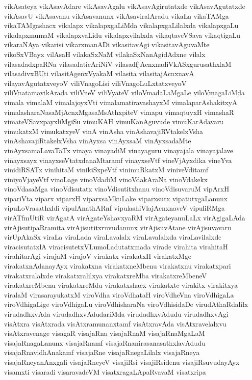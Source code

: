 {vikAsateya
vikAsavAdare
vikAsavAgalu
vikAsavAgirutatxde
vikAsavAgutatxde
vikAsavU
vikAsavanu
vikAsavanunx
vikAsaviralAradu
vikaLa
vikaTAMga
vikaTAMgashacx
vikalapx
vikalapxgaLiMda
vikalapxgaLilalxda
vikalapxgaLu
vikalapxmumaM
vikalapxvaLidu
vikalapxvilalxda
vikaqtaveVSava
vikaqtigaLu
vikaraNAya
vikarisi
vikarxmanADi
vikasitavAgi
vikasitavAguvaMte
vikoSxVBayx
vilAsaH
vilakaSxNaM
vilakaSxNanAgidAdxne
vilalx
vilasadadxpaRNa
vilasadaticAriNiV
vilasadfjAcnxnadiVkASxgurusathxlaM
vilasadivxBUti
vilasitAgenxVyakaM
vilasita
vilasitajAcnxnavA
vilayavAgutatxveyoV
viliVnagoLisi
viliVnagoLuLxtatxveyoV
viliVnatamavikArada
viliVneV
viliVyateV
viloVmadaLaMgaLe
viloVmagaLiMda
vimala
vimalaM
vimalajoyxVti
vimalamatiravashayxM
vimalaparAshakitxyA
vimalasharaNasaMjAcnxMgasaMsAthxpiteV
vimapu
vimaqtuyxH
vimashaR
vimateVSavxpayxliMgiSu
vimuKAH
vimuKanAguvude
vimuKarAdavaru
vimukatxM
vimukatxyeV
vinA
vinAsha
vinAshavajiRVtakelxVsha
vinAshavajiRtakelxVsha
vinAyxsa
vinAyxsaM
vinAyxsadaMte
vinAyxsamaLavaTaTx
vinaya
vinayadiM
vinayaguru
vinayajala
vinayajalave
vinayxsayx
vinayxseVtatxdanaMtaramf
vinayxseVtf
vineVjAyxdika
vineYva
vinidiRSATx
vinihitaM
vinikiSxpeVtf
vinimuRkatxM
viniveVditamf
viniyoVjayeVtf
vinoLage
vinoVdadiM
vinoVdakAraNa
vinoVdakekx
vinoVdasaMga
vinoVdisutatx
vinoVdisutitxhanu
vinoVdisuvaruM
vipArxH
vipariVta
viparx
viparxH
viparxsaMkuLake
viparxsutx
vipatutxgaLanunx
vipuLoVrasathxldi
vipulAnathARnf
vipulashiVlajAcnxnaveV
vipuliRMga
virATfmUtiR
virAgatA
virAgateYshavxyaRM
virAgateyanuLaLx
virAgigaLAda
virAjisutipaRramita
virAjisutitxruvudanunx
virAjisuvAtane
virAjisuvavaru
virUpAkaSx
viraLa
viraLada
viraLavalalx
viraLavalalxda
viraLavilalxde
viracisutatxlA
viracisutetxVLumoLadutatxmada
virade
virahita
virahitaH
virahitarAgi
virajaM
virajoV
virakatx
virakatxH
virakatxMge
virakatxnAdanayAyx
virakatxna
virakatxneMbenu
virakatxnu
virakatxpari
virakatxralalxde
virakatxralilxya
virakatxreMba
virakatxreMbeneV
virakatxreMbenu
virakatxreMdu
virakatxshacx
virakatxte
virakitx
virakitxya
viralaM
virasarayukatxM
viroVdha
viroVdhataH
viroVdheVna
viroVdhigaLa
viroVdhigaLige
viroVdhigaLu
viroVdhisharaNa
viroVdhisidaDe
virudAthaRdalilx
virudadhxvAda
virudadhxvAdudariMda
virudadhxvAdudu
virudadhxvAgi
visAtxra
visAtxrada
visAtxramunanxtamf
visAtxravAda
visAtxravelalxvu
visAtxravenage
visagaR
visajaRna
visajaRnaM
visajaRnaMgaLaM
visajaRnagaLanunx
visajaRnamf
visajaRnanirasanasathxlavAdudu
visajaRnavidhAnakamf
visajaRne
visajaRnegaLilalx
visajaRneya
visajaRneyanAnxgali
visajaRneyeV
visajiRsi
visajiRsidenu
visajiRsuvudayAyx
visamxti
visaradi
visaravadeVM
visatxragaLApaRvavaM
visatxripa
}
